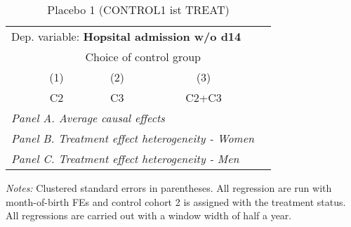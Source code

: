  \begin{table}[H] \centering \begin{threeparttable} \caption{Placebo 1 (CONTROL1 ist TREAT) } {\def\sym#1{\ifmmode^{#1}\else\(^{#1}\)\fi} \begin{tabular}{l*{4}{c}} \toprule \multicolumn{4}{l}{Dep. variable: \textbf{Hopsital admission w/o d14}} \\ & \multicolumn{3}{c}{Choice of control group} \\ \cmidrule(lr){2-4}
            &\multicolumn{1}{c}{(1)}&\multicolumn{1}{c}{(2)}&\multicolumn{1}{c}{(3)}\\
            &\multicolumn{1}{c}{C2}&\multicolumn{1}{c}{C3}&\multicolumn{1}{c}{C2+C3}\\
\midrule
 \multicolumn{4}{l}{\emph{Panel A. Average causal effects}} \\      \midrule\multicolumn{4}{l}{\emph{Panel B. Treatment effect heterogeneity - Women}} \\      \midrule\multicolumn{4}{l}{\emph{Panel C. Treatment effect heterogeneity - Men}} \\      
\bottomrule \end{tabular} } \begin{tablenotes} \item \scriptsize \emph{Notes:} Clustered standard errors in parentheses. All regression are run with month-of-birth FEs and control cohort 2 is assigned with the treatment status. All regressions are carried out with a window width of half a year. \end{tablenotes} \end{threeparttable} \end{table} 
